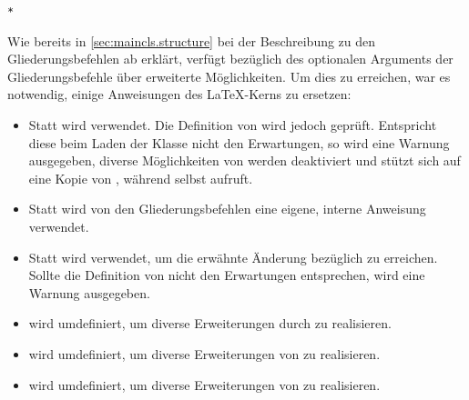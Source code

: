 \begin{Declaration}
                          \nobreak\texttt{*}
\end{Declaration}
Wie bereits in \autoref{sec:maincls.structure} bei der
Beschreibung zu den Gliederungsbefehlen ab
 erklärt, verfügt \KOMAScript{}
bezüglich des optionalen Arguments der Gliederungsbefehle über erweiterte
Möglichkeiten. Um dies zu erreichen, war es notwendig, einige Anweisungen
des \LaTeX-Kerns zu ersetzen:
\begin{itemize}
\item Statt
  wird  verwendet. Die Definition
  von  wird jedoch geprüft. Entspricht diese beim Laden
  der Klasse nicht den Erwartungen, so wird eine Warnung
  ausgegeben, diverse
  Möglichkeiten von \KOMAScript{} werden deaktiviert und
   stützt sich auf eine Kopie von
  , während  selbst
   aufruft.
\item Statt  wird
  von den Gliederungsbefehlen eine eigene, interne Anweisung
  verwendet.
\item Statt  wird
   verwendet, um die erwähnte Änderung
  bezüglich  zu erreichen. Sollte die Definition von
   nicht den Erwartungen entsprechen, wird eine Warnung
  ausgegeben.
\item {} wird umdefiniert,
  um diverse Erweiterungen durch \KOMAScript{} zu realisieren.
\item {} wird
  umdefiniert, um diverse Erweiterungen von \KOMAScript{} zu realisieren.
\item {} wird
  umdefiniert, um diverse Erweiterungen von \KOMAScript{} zu realisieren.
\end{itemize}

